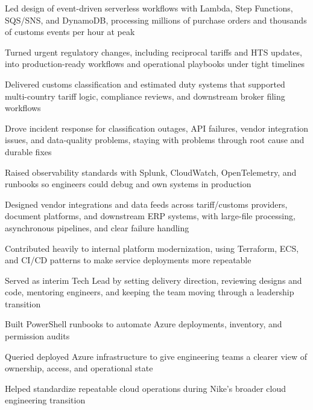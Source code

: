 \documentclass[10pt]{article}
\begin{document}
\begin{entryitems}
  \item Led design of event-driven serverless workflows with Lambda, Step Functions, SQS/SNS, and DynamoDB, processing millions of purchase orders and thousands of customs events per hour at peak
  \item Turned urgent regulatory changes, including reciprocal tariffs and HTS updates, into production-ready workflows and operational playbooks under tight timelines
  \item Delivered customs classification and estimated duty systems that supported multi-country tariff logic, compliance reviews, and downstream broker filing workflows
  \item Drove incident response for classification outages, API failures, vendor integration issues, and data-quality problems, staying with problems through root cause and durable fixes
  \item Raised observability standards with Splunk, CloudWatch, OpenTelemetry, and runbooks so engineers could debug and own systems in production
  \item Designed vendor integrations and data feeds across tariff/customs providers, document platforms, and downstream ERP systems, with large-file processing, asynchronous pipelines, and clear failure handling
  \item Contributed heavily to internal platform modernization, using Terraform, ECS, and CI/CD patterns to make service deployments more repeatable
  \item Served as interim Tech Lead by setting delivery direction, reviewing designs and code, mentoring engineers, and keeping the team moving through a leadership transition
\end{entryitems}

\begin{entryitems}
  \item Built PowerShell runbooks to automate Azure deployments, inventory, and permission audits
  \item Queried deployed Azure infrastructure to give engineering teams a clearer view of ownership, access, and operational state
  \item Helped standardize repeatable cloud operations during Nike's broader cloud engineering transition
\end{entryitems}
\end{document}
